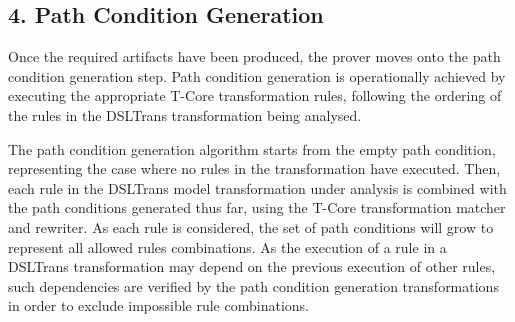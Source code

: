 
% 

\subsection*{4. Path Condition Generation}
\label{sec:path_cond_gen}

Once the required artifacts have been produced, the prover moves onto the path
condition generation step. Path condition generation is operationally achieved
by executing the appropriate T-Core transformation rules, following the ordering of the rules in the DSLTrans
transformation being analysed.

The path condition generation algorithm starts from the empty path condition,
representing the case where no rules in the transformation have executed. Then, each rule in the DSLTrans model transformation under analysis
is combined with the path conditions generated thus far, using the T-Core transformation matcher and rewriter. As each rule is
considered, the set of path conditions will grow to represent all allowed
rules combinations. As the execution of a rule in a DSLTrans
transformation may depend on the previous execution of other rules, such
dependencies are verified by the path condition generation
transformations in order to exclude impossible rule combinations.

